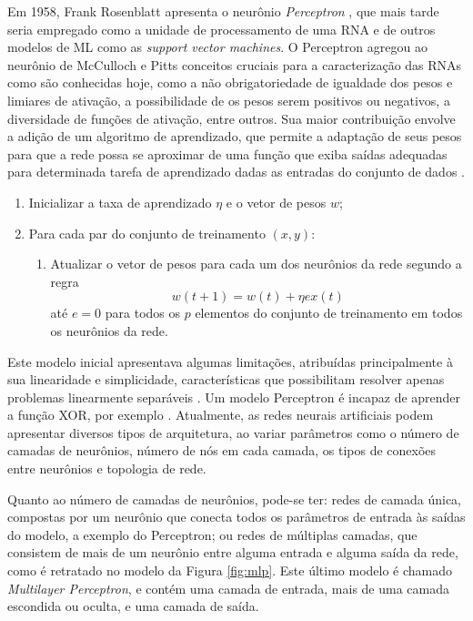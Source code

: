Em 1958, Frank Rosenblatt apresenta o neurônio \emph{Perceptron} \cite{rosenblatt1958perceptron}, que mais tarde seria empregado como a unidade de processamento de uma RNA e de outros modelos de ML como as \emph{support vector machines}. O Perceptron agregou ao neurônio de McCulloch e Pitts conceitos cruciais para a caracterização das RNAs como são conhecidas hoje, como a não obrigatoriedade de igualdade dos pesos e limiares de ativação, a possibilidade de os pesos serem positivos ou negativos, a diversidade de funções de ativação, entre outros. Sua maior contribuição envolve a adição de um algoritmo de aprendizado, que permite a adaptação de seus pesos para que a rede possa se aproximar de uma função que exiba saídas adequadas para determinada tarefa de aprendizado dadas as entradas do conjunto de dados \cite{braga2000redes}.

\begin{enumerate}
	\item Inicializar a taxa de aprendizado $\eta$ e o vetor de pesos $w$;
	\item Para cada par do conjunto de treinamento $(x, y)$:
	\begin{enumerate}
		\item Atualizar o vetor de pesos para cada um dos neurônios da rede segundo a regra
		\begin{equation}\label{eq:regra_aprendizado}
			w(t+1) = w(t) + \eta e x(t)
		\end{equation}
		até $e = 0$ para todos os $p$ elementos do conjunto de treinamento em todos os neurônios da rede.
	\end{enumerate}
\end{enumerate}


Este modelo inicial apresentava algumas limitações, atribuídas principalmente à sua linearidade e simplicidade, características que possibilitam resolver apenas problemas linearmente separáveis \cite{braga2000redes}. Um modelo Perceptron é incapaz de aprender a função XOR, por exemplo \cite{goodfellow2016deep}. Atualmente, as redes neurais artificiais podem apresentar diversos tipos de arquitetura, ao variar parâmetros como o número de camadas de neurônios, número de nós em cada camada, os tipos de conexões entre neurônios e topologia de rede.

Quanto ao número de camadas de neurônios, pode-se ter: redes de camada única, compostas por um neurônio que conecta todos os parâmetros de entrada às saídas do modelo, a exemplo do Perceptron; ou redes de múltiplas camadas, que consistem de mais de um neurônio entre alguma entrada e alguma saída da rede, como é retratado no modelo da Figura \ref{fig:mlp}. Este último modelo é chamado \emph{Multilayer Perceptron}, e contém uma camada de entrada, mais de uma camada escondida ou oculta, e uma camada de saída.

